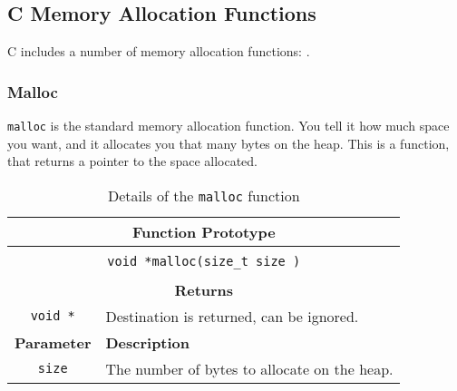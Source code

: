 \clearpage
\subsection{C Memory Allocation Functions} %
\label{sub:c_memory_allocation}

C includes a number of memory allocation functions: .

\subsubsection{Malloc} %
\label{ssub:malloc}

\texttt{malloc} is the standard memory allocation function. You tell it how much space you want, and it allocates you that many bytes on the heap. This is a function, that returns a pointer to the space allocated.

\begin{table}[h]
  \centering
  \begin{tabular}{|c|p{9.5cm}|}
    \hline
    \multicolumn{2}{|c|}{\textbf{Function Prototype}} \\
    \hline
    \multicolumn{2}{|c|}{} \\
    \multicolumn{2}{|c|}{\texttt{void *malloc(size\_t size )}} \\
    \multicolumn{2}{|c|}{} \\
    \hline
    \multicolumn{2}{|c|}{\textbf{Returns}} \\
    \hline
    \texttt{void *} & Destination is returned, can be ignored. \\
    \hline
    \textbf{Parameter} & \textbf{Description} \\
    \hline
    \texttt{ size } & The number of bytes to allocate on the heap. \\
    \hline
  \end{tabular}
  \caption{Details of the \texttt{malloc} function}
  \label{tbl:malloc}
\end{table}




